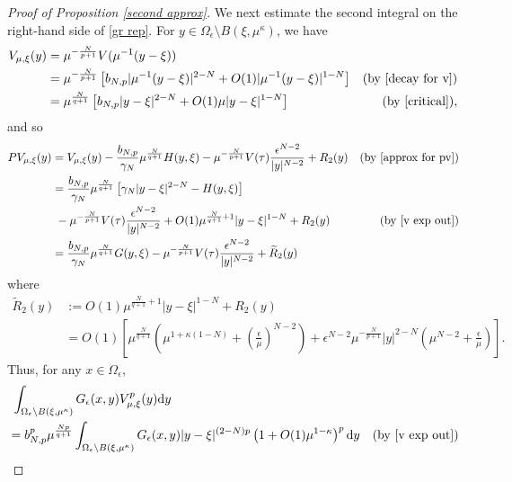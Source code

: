 \documentclass[reqno]{amsart}
\theoremstyle{remark}
\newcommand{\ep}{\epsilon}
\newcommand{\ga}{\gamma}
\newcommand{\wtr}{\widetilde{R}}
\newcommand{\dy}{\textup{d}y}
\newcommand{\mx}{{\mu,\xi}}
\renewcommand{\(}{\left(}
\renewcommand{\)}{\right)}
\numberwithin{equation}{section}
\begin{document}
\begin{proof}[Proof of Proposition \ref{second approx}]
\medskip
We next estimate the second integral on the right-hand side of \eqref{gr rep}. For $y \in \Omega_\ep\setminus B(\xi,\mu^\kappa)$, we have
\begin{equation}\label{v exp out}
\begin{aligned}
V_\mx(y) &= \mu^{-\frac{N}{p+1}}V(\mu^{-1}(y-\xi))\\
&= \mu^{-\frac{N}{p+1}} \left[b_{N,p}|\mu^{-1}(y-\xi)|^{2-N}+O(1)|\mu^{-1}(y-\xi)|^{1-N}\right] &(\textup{by } \eqref{decay for v})\\
&= \mu^{\frac{N}{q+1}} \left[b_{N,p}|y-\xi|^{2-N}+O(1)\mu|y-\xi|^{1-N}\right] &(\textup{by } \eqref{critical}),
\end{aligned}
\end{equation}
and so
\begin{equation}\label{pv outer}
\begin{aligned}
PV_\mx(y) &= V_\mx(y) - \frac{b_{N,p}}{\ga_N}\mu^{\frac{N}{q+1}}H(y,\xi) - \mu^{-\frac{N}{p+1}}V(\tau) \frac{\ep^{N-2}}{|y|^{N-2}} + R_2(y) &(\textup{by } \eqref{approx for pv})\\
&=\frac{b_{N,p}}{\ga_N}\mu^{\frac{N}{q+1}} \left[\ga_N|y-\xi|^{2-N}-H(y,\xi)\right] \\
&\ -\mu^{-\frac{N}{p+1}}V(\tau)\frac{\ep^{N-2}}{|y|^{N-2}} + O(1)\mu^{\frac{N}{q+1}+1}|y-\xi|^{1-N} + R_2(y) &(\textup{by }\eqref{v exp out})\\
&=\frac{b_{N,p}}{\ga_N}\mu^{\frac{N}{q+1}}G(y,\xi) - \mu^{-\frac{N}{p+1}}V(\tau)\frac{\ep^{N-2}}{|y|^{N-2}} + \wtr_2(y)
\end{aligned}
\end{equation}
where
\begin{equation}\label{wtr 2}
\begin{aligned}
\wtr_2(y) &:= O(1)\mu^{\frac{N}{q+1}+1}|y-\xi|^{1-N}+R_2(y)\\
&=O(1)\left[\mu^{\frac{N}{q+1}} \(\mu^{1+\kappa(1-N)}+\(\frac{\ep}{\mu}\)^{N-2}\) + \ep^{N-2}\mu^{-\frac{N}{p+1}} |y|^{2-N} \(\mu^{N-2}+\frac{\ep}{\mu}\)\right].
\end{aligned}
\end{equation}
Thus, for any $x \in \Omega_\ep$,
\begin{equation}\label{u rep}
\begin{aligned}
&\ \int_{\Omega_\ep\setminus B(\xi,\mu^\kappa)} G_\ep(x,y) V_\mx^p(y)\dy \\
&= b_{N,p}^p\mu^{\frac{Np}{q+1}} \int_{\Omega_\ep\setminus B(\xi,\mu^\kappa)} G_\ep(x,y) |y-\xi|^{(2-N)p} \(1+O(1)\mu^{1-\kappa}\)^p\dy &(\textup{by } \eqref{v exp out}) \\

\end{aligned}
\end{equation}
\end{proof}
\end{document}
